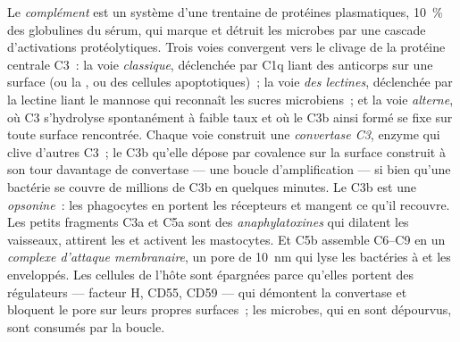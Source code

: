 \begin{definition}[Le complément]\label{def:b3:innate-immunity:complement}
Le \emph{complément} est un système d'une trentaine de protéines
plasmatiques, \qty{10}{\%} des globulines du sérum, qui marque et
détruit les microbes par une cascade d'activations protéolytiques. Trois
voies convergent vers le clivage de la protéine centrale C3~: la voie
\emph{classique}, déclenchée par C1q liant des anticorps sur une surface
(ou la , ou des cellules apoptotiques)~; la voie
\emph{des lectines}, déclenchée par la lectine liant le mannose qui
reconnaît les sucres microbiens~; et la voie \emph{alterne}, où C3
s'hydrolyse spontanément à faible taux et où le C3b ainsi formé se fixe
sur toute surface rencontrée. Chaque voie construit une \emph{convertase
C3}, enzyme qui clive d'autres C3~; le C3b qu'elle dépose par covalence
sur la surface construit à son tour davantage de convertase --- une
boucle d'amplification --- si bien qu'une bactérie se couvre de millions
de C3b en quelques minutes. Le C3b est une \emph{opsonine}~: les
phagocytes en portent les récepteurs et mangent ce qu'il recouvre. Les
petits fragments C3a et C5a sont des \emph{anaphylatoxines} qui dilatent
les vaisseaux, attirent les  et activent les mastocytes. Et
C5b assemble C6--C9 en un \emph{complexe d'attaque membranaire}, un pore
de \qty{10}{nm} qui lyse les bactéries à  et les 
enveloppés. Les cellules de l'hôte sont épargnées parce qu'elles portent
des régulateurs --- facteur H, CD55, CD59 --- qui démontent la
convertase et bloquent le pore sur leurs propres surfaces~; les
microbes, qui en sont dépourvus, sont consumés par la boucle.
\end{definition}


